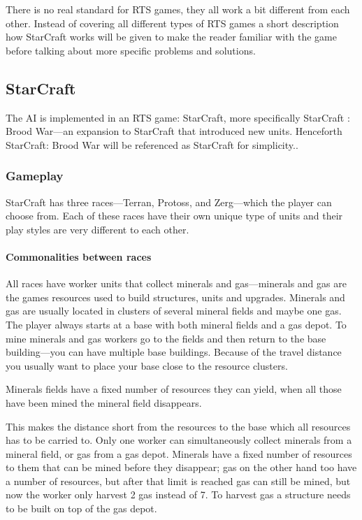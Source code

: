 There is no real standard for RTS games, they all work a bit different from each other. Instead of covering all different types of RTS games a short description how StarCraft works will be given to make the reader familiar with the game before talking about more specific problems and solutions.

\subsection{StarCraft}
The AI is implemented in an RTS game: StarCraft, more specifically StarCraft : Brood War—an expansion to StarCraft that introduced new units. Henceforth StarCraft: Brood War will be referenced as StarCraft for simplicity..


\subsubsection{Gameplay}
StarCraft has three races—Terran, Protoss, and Zerg—which the player can choose from. Each of these races have their own unique type of units and their play styles are very different to each other.

\paragraph{Commonalities between races}
All races have worker units that collect minerals and gas—minerals and gas are the games resources used to build structures, units and upgrades. Minerals and gas are usually located in clusters of several mineral fields and maybe one gas. The player always starts at a base with both mineral fields and a gas depot. To mine minerals and gas workers go to the fields and then return to the base building—you can have multiple base buildings. Because of the travel distance you usually want to place your base close to the resource clusters.

Minerals fields have a fixed number of resources they can yield, when all those have been mined the mineral field disappears.

This makes the distance short from the resources to the base which all resources has to be carried to. Only one worker can simultaneously collect minerals from a mineral field, or gas from a gas depot. Minerals have a fixed number of resources to them that can be mined before they disappear; gas on the other hand too have a number of resources, but after that limit is reached gas can still be mined, but now the worker only harvest 2 gas instead of 7. To harvest gas a structure needs to be built on top of the gas depot.

